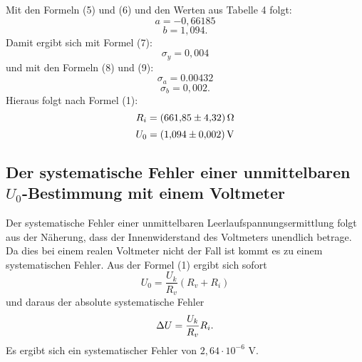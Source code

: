 Mit den Formeln (5) und (6) und den Werten aus Tabelle 4 folgt:
\begin{displaymath}
a=-0,66185
\end{displaymath}
\begin{displaymath}
b=1,094\text{.}
\end{displaymath}
Damit ergibt sich mit Formel (7):
\begin{displaymath}
\sigma_y=0,004
\end{displaymath}
und mit den Formeln (8) und (9):
\begin{displaymath}
\sigma_a=0.00432
\end{displaymath}
\begin{displaymath}
\sigma_b=0,002\text{.}
\end{displaymath}
Hieraus folgt nach Formel (1):
\begin{displaymath}
R_i=\SI{661,85 \pm 4,32}{\ohm}
\end{displaymath}
\begin{displaymath}
U_0=\SI{1,094 \pm 0,002}{\volt}
\end{displaymath}
























































\subsection{Der systematische Fehler einer unmittelbaren $U_0$-Bestimmung mit einem Voltmeter}
Der systematische Fehler einer unmittelbaren Leerlaufspannungsermittlung folgt aus der Näherung, dass
der Innenwiderstand des Voltmeters unendlich betrage. Da dies bei einem realen Voltmeter nicht der
Fall ist kommt es zu einem systematischen Fehler.
Aus der Formel (1) ergibt sich sofort
\begin{equation}
U_0 = \frac{U_k}{R_v}(R_v + R_i)
\end{equation}
und daraus der absolute systematische Fehler
\begin{equation}
\Delta U = \frac{U_k}{R_v}R_i \text.
\end{equation}
Es ergibt sich ein systematischer Fehler von $2,64 \cdot 10^{-6} $ V.





